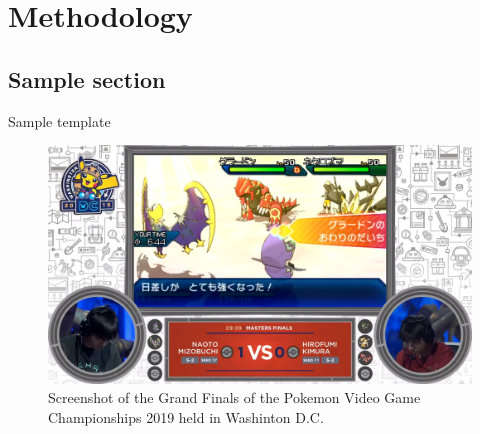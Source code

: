 \chapter{Methodology}\label{ch:4}

\section{Sample section}

Sample template \cite{alphago}

\begin{figure}
  \centering
  \includegraphics[width=\columnwidth]{resources/1_intro/vgc2019.png}
    \caption{Screenshot of the Grand Finals of the Pokemon Video Game Championships 2019 held in Washinton D.C.}
\end{figure}